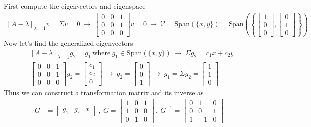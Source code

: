 \documentclass[twoside]{article}
\begin{document}
% 
First compute the eigenvectors and eigenspace 
%
\begin{align*}
 \left[ A - \lambda \right]_{\lambda = 1} v = \Sigma v = 0 \ \rightarrow \ 
 \left[ \begin{array}{ccc} 0 & 0 & 1 \\ 0 & 0 & 1 \\ 0 & 0 & 0 \end{array} \right] v = 0 \ \rightarrow \ \mathcal{V} = \mathrm{Span} \left( \lbrace x , y \rbrace  \right)
= \mathrm{Span} \left( \left\lbrace \left[ \begin{array}{c} 1 \\ 0  \\ 0  \end{array} \right] ,  \left[ \begin{array}{c} 0 \\ 1  \\ 0  \end{array} \right] \right\rbrace \right)
\end{align*}
%
%
Now let's find the generalized eigenvectors
%
\begin{align*}
&\left[ A - \lambda \right]_{\lambda = 1} g_2 = g_1 \ \mathrm{where} \ g_1 \in \mathrm{Span} \left( \lbrace x , y \rbrace  \right)
\ \rightarrow \ \Sigma g_2 = c_1 x + c_2 y
\\
 & \left[ \begin{array}{ccc} 0 & 0 & 1 \\ 0 & 0 & 1 \\ 0 & 0 & 0 \end{array} \right] g_2 =  \left[ \begin{array}{c} c_1 \\ c_2 \\ 0  \end{array} \right] \ \rightarrow \ 
  g_2 =   \left[ \begin{array}{c} 0 \\ 0  \\ 1 \end{array} \right] \ \rightarrow \  g_1 = \Sigma g_2 =  \left[ \begin{array}{c} 1 \\ 1  \\ 0 \end{array} \right] 
\end{align*}
%
Thus we can construct a transformation matrix and its inverse as
\begin{align*}
 G &= \left[ \begin{array}{cccc} g_1 & g_2 & x  \end{array} \right]
 \ , \ 
 G = \left[ \begin{array}{ccc} 1 & 0 & 1 \\ 1 & 0 & 0  \\ 0 & 1 & 0  \end{array} \right]
 \  , \ 
 G^{-1} = \left[ \begin{array}{ccc} 0 & 1 & 0 \\ 0 & 0 & 1  \\ 1 & -1 & 0 \end{array} \right]
\end{align*}


\end{document}

